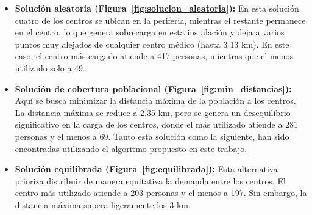 \documentclass[12pt,a4paper]{book}
\begin{document}
\begin{itemize}
    \item \textbf{Solución aleatoria (Figura~\ref{fig:solucion_aleatoria}):} En esta solución cuatro de los centros se ubican en la periferia, mientras el restante permanece en el centro, lo que genera sobrecarga en esta instalación y deja a varios puntos muy alejados de cualquier centro médico (hasta 3.13 km). En este caso, el centro más cargado atiende a 417 personas, mientras que el menos utilizado solo a 49.
    \item \textbf{Solución de cobertura poblacional (Figura~\ref{fig:min_distancias}):} Aquí se busca minimizar la distancia máxima de la población a los centros. La distancia máxima se reduce a 2.35 km, pero se genera un desequilibrio significativo en la carga de los centros, donde el más utilizado atiende a 281 personas y el menos a 69. Tanto esta solución como la siguiente, han sido encontradas
    utilizando el algoritmo propuesto en este trabajo.
    \item \textbf{Solución equilibrada (Figura~\ref{fig:equilibrada}):} Esta alternativa prioriza distribuir de manera equitativa la demanda entre los centros. El centro más utilizado atiende a 203 personas y el menos a 197. Sin embargo, la distancia máxima supera ligeramente los 3 km.
\end{itemize}
\end{document}
